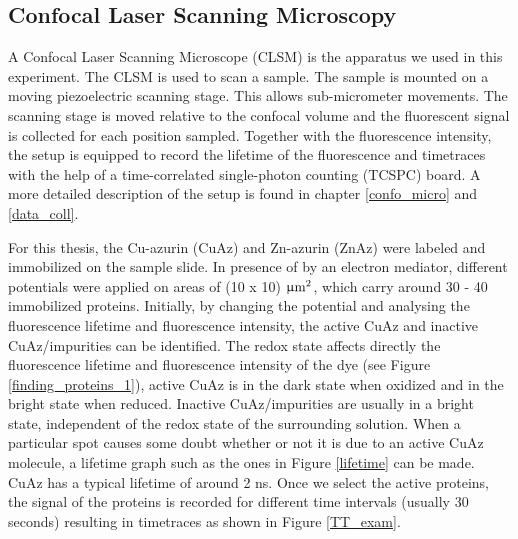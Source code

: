 \documentclass[twoside,single]{lion-msc}
\begin{document}
\subsection{Confocal Laser Scanning Microscopy}
A Confocal Laser Scanning Microscope (CLSM) is the apparatus we used in this experiment. The CLSM is used to scan a sample. The sample is mounted on a moving piezoelectric scanning stage. This allows sub-micrometer movements. The scanning stage is moved relative to the confocal volume and the fluorescent signal is collected for each position sampled. Together with the fluorescence intensity, the setup is equipped to record the lifetime of the fluorescence and timetraces with the help of a time-correlated single-photon counting (TCSPC) board. A more detailed description of the setup is found in chapter \ref{confo_micro} and \ref{data_coll}.

For this thesis, the Cu-azurin (CuAz) and Zn-azurin (ZnAz) were labeled and immobilized on the sample slide. In presence of by an electron mediator, different potentials were applied on areas of (10 x 10) $\upmu \textup{m}^{2}$, which carry around 30 - 40 immobilized proteins. Initially, by changing the potential and analysing the fluorescence lifetime and fluorescence intensity, the active CuAz and inactive CuAz/impurities can be identified. The redox state affects directly the fluorescence lifetime and fluorescence intensity of the dye (see Figure \ref{finding_proteins_1}),  active CuAz is in the dark state when oxidized and in the bright state when reduced. Inactive CuAz/impurities are usually in a bright state, independent of the redox state of the surrounding solution. When a particular spot causes some doubt whether or not it is due to an active CuAz molecule, a lifetime graph such as the ones in Figure \ref{lifetime} can be made. CuAz has a typical lifetime of around 2 ns. 
Once we select the active proteins, the signal of the proteins is recorded for different time intervals (usually 30 seconds) resulting in timetraces as shown in Figure \ref{TT_exam}.
\end{document}
